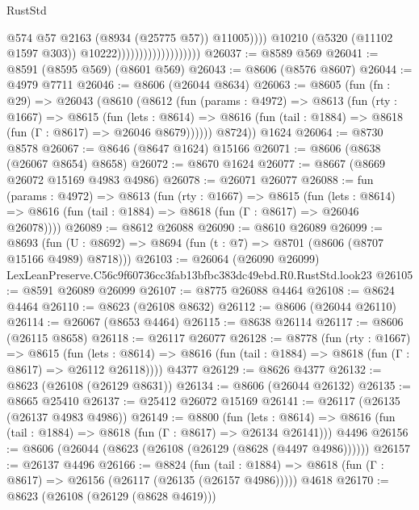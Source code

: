 \begin{lexlean}{RustStd}
\begin{coremodule}
                                                  @574
                                                  @57
                                                  @2163
                                                  (@8934 (@25775 @57))
                                                  @11005))))
                                          @10210
                                          (@5320 (@11102 @1597 @303))
                                          @10222)))))))))))))))))))
@26037 := @8589 @569
@26041 := @8591 (@8595 @569) (@8601 @569)
@26043 := @8606 (@8576 @8607)
@26044 := @4979 @7711
@26046 := @8606 (@26044 @8634)
@26063 := @8605
    (fun (fn : @29) =>
    @26043
      (@8610
        (@8612
          (fun (params : @4972) =>
          @8613
            (fun (rty : @1667) =>
            @8615
              (fun (lets : @8614) =>
              @8616 (fun (tail : @1884) => @8618 (fun (Γ : @8617) => @26046 @8679))))))
        @8724))
    @1624
@26064 := @8730 @8578
@26067 := @8646 (@8647 @1624) @15166
@26071 := @8606 (@8638 (@26067 @8654) @8658)
@26072 := @8670 @1624
@26077 := @8667 (@8669 @26072 @15169 @4983 @4986)
@26078 := @26071 @26077
@26088 := fun (params : @4972) =>
  @8613
    (fun (rty : @1667) =>
    @8615
      (fun (lets : @8614) =>
      @8616 (fun (tail : @1884) => @8618 (fun (Γ : @8617) => @26046 @26078))))
@26089 := @8612 @26088
@26090 := @8610 @26089
@26099 := @8693
    (fun (U : @8692) => @8694 (fun (t : @7) => @8701 (@8606 (@8707 @15166 @4989) @8718)))
@26103 := @26064 (@26090 @26099) LexLeanPreserve.C56c9f60736cc3fab13bfbc383dc49ebd.R0.RustStd.look23
@26105 := @8591 @26089 @26099
@26107 := @8775 @26088 @4464
@26108 := @8624 @4464
@26110 := @8623 (@26108 @8632)
@26112 := @8606 (@26044 @26110)
@26114 := @26067 (@8653 @4464)
@26115 := @8638 @26114
@26117 := @8606 (@26115 @8658)
@26118 := @26117 @26077
@26128 := @8778
    (fun (rty : @1667) =>
    @8615
      (fun (lets : @8614) =>
      @8616 (fun (tail : @1884) => @8618 (fun (Γ : @8617) => @26112 @26118))))
    @4377
@26129 := @8626 @4377
@26132 := @8623 (@26108 (@26129 @8631))
@26134 := @8606 (@26044 @26132)
@26135 := @8665 @25410
@26137 := @25412 @26072 @15169
@26141 := @26117 (@26135 (@26137 @4983 @4986))
@26149 := @8800
    (fun (lets : @8614) => @8616 (fun (tail : @1884) => @8618 (fun (Γ : @8617) => @26134 @26141)))
    @4496
@26156 := @8606 (@26044 (@8623 (@26108 (@26129 (@8628 (@4497 @4986))))))
@26157 := @26137 @4496
@26166 := @8824
    (fun (tail : @1884) => @8618 (fun (Γ : @8617) => @26156 (@26117 (@26135 (@26157 @4986)))))
    @4618
@26170 := @8623 (@26108 (@26129 (@8628 @4619)))

\end{coremodule}
\end{lexlean}
